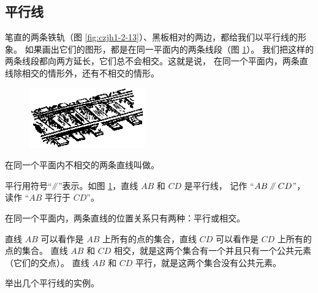 \subsection{平行线}\label{subsec:czjh1-2-4}

笔直的两条铁轨（图 \ref{fig:czjh1-2-13}）、黑板相对的两边，都给我们以平行线的形象。
如果画出它们的图形，都是在同一平面内的两条线段（图 \ref{fig:czjh1-2-14}）。
我们把这样的两条线段都向两方延长，它们总不会相交。这就是说，
在同一个平面内，两条直线除相交的情形外，还有不相交的情形。

\begin{figure}[htbp]
    \centering
    \begin{minipage}[b]{7cm}
        \centering
        \includegraphics[width=5cm]{../pic/czjh1-ch2-13.png}
        \caption{}\label{fig:czjh1-2-13}
    \end{minipage}
    \qquad
    \begin{minipage}[b]{7cm}
        \centering
        
        \caption{}\label{fig:czjh1-2-14}
    \end{minipage}
\end{figure}

在同一个平面内不相交的两条直线叫做。

平行用符号“$\pingxing$”表示。如图 \ref{fig:czjh1-2-14}，直线 $AB$ 和 $CD$ 是平行线，
记作 “$AB \pingxing CD$”， 读作 “$AB$ 平行于 $CD$”。

在同一个平面内，两条直线的位置关系只有两种：平行或相交。

直线 $AB$ 可以看作是 $AB$ 上所有的点的集合，直线 $CD$ 可以看作是 $CD$ 上所有的点的集合。
直线 $AB$ 和 $CD$ 相交，就是这两个集合有一个并且只有一个公共元素（它们的交点）。
直线 $AB$ 和 $CD$ 平行，就是这两个集合没有公共元素。

\begin{lianxi}
    举出几个平行线的实例。
\end{lianxi}



